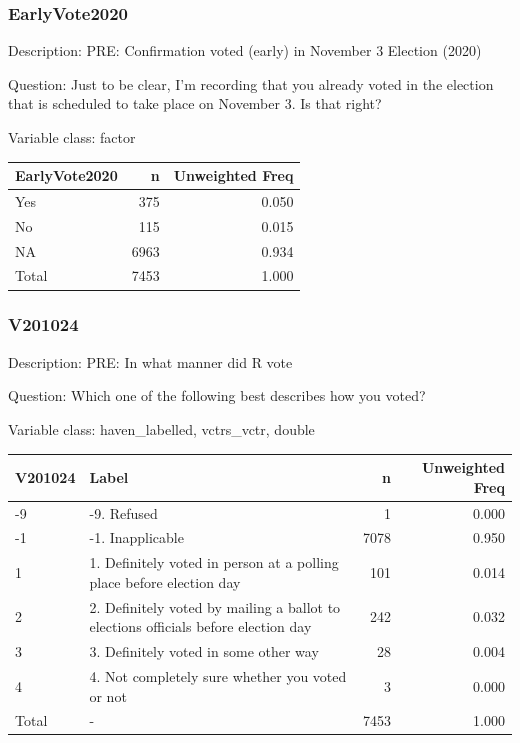 \documentclass[
]{krantz}
\begin{document}
\hypertarget{earlyvote2020}{%
\subsubsection*{EarlyVote2020}\label{earlyvote2020}}


Description: PRE: Confirmation voted (early) in November 3 Election (2020)

Question: Just to be clear, I'm recording that you already voted in the election that is scheduled to take place on November 3. Is that right?

Variable class: factor

\begin{tabular}[t]{l|r|r}
\hline
EarlyVote2020 & n & Unweighted Freq\\
\hline
Yes & 375 & 0.050\\
\hline
No & 115 & 0.015\\
\hline
NA & 6963 & 0.934\\
\hline
Total & 7453 & 1.000\\
\hline
\end{tabular}

\hypertarget{v201024}{%
\subsubsection*{V201024}\label{v201024}}


Description: PRE: In what manner did R vote

Question: Which one of the following best describes how you voted?

Variable class: haven\_labelled, vctrs\_vctr, double

\begin{tabular}[t]{l|l|r|r}
\hline
V201024 & Label & n & Unweighted Freq\\
\hline
-9 & -9. Refused & 1 & 0.000\\
\hline
-1 & -1. Inapplicable & 7078 & 0.950\\
\hline
1 & 1. Definitely voted in person at a polling place before election day & 101 & 0.014\\
\hline
2 & 2. Definitely voted by mailing a ballot to elections officials before  election day & 242 & 0.032\\
\hline
3 & 3. Definitely voted in some other way & 28 & 0.004\\
\hline
4 & 4. Not completely sure whether you voted or not & 3 & 0.000\\
\hline
Total & - & 7453 & 1.000\\
\hline
\end{tabular}
\end{document}
